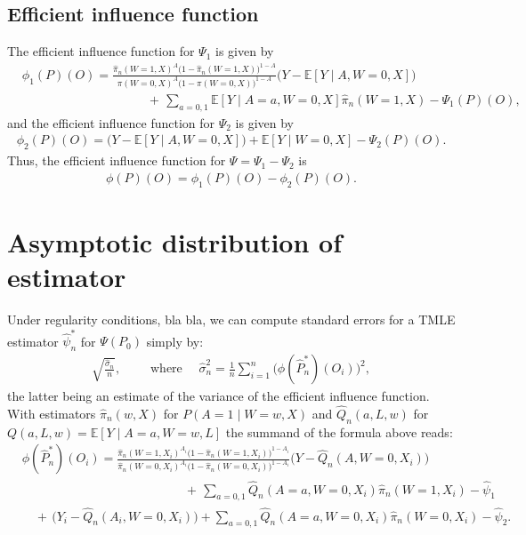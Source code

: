 \documentclass{article}
\newcommand{\EE}{\mathbb{E}}
\newcommand{\1}{\mathbb{1}}
\begin{document}
\subsection{Efficient influence function}

 The efficient influence function for \(\Psi_1\) is given
by
\begin{align*}
 & \phi_1 ( P ) (O) =  \frac{ \hat{\pi}_n ( W=1, X)^A \big( 1-
  \hat{\pi}_n ( W=1, X)\big)^{1-A}}{\pi ( W=0, X)^A \big( 1-
  \pi ( W=0, X)\big)^{1-A}} \big( Y - \EE[Y \mid A,W=0,X] \big)  \\
&\qquad\qquad\qquad\qquad\qquad  + \, 
  \sum_{a=0,1}\EE [Y \mid A=a, W=0, X]
  \hat{\pi}_n ( W=1, X) - \Psi_1(P)(O), 
\end{align*}
and the efficient influence function for \(\Psi_2\) is given by
\begin{align*}
  \phi_2 ( P )(O) = \big( Y - \EE[Y \mid A,W=0,X] \big)  +
  \EE [Y \mid  W=0, X]
  - \Psi_2(P)(O). 
\end{align*}
Thus, the efficient influence function for \(\Psi = \Psi_1 - \Psi_2\)
is
\begin{align*}
\phi (P) (O) = \phi_1(P)(O) - \phi_2(P)(O). 
\end{align*}

\section{Asymptotic distribution of estimator}

Under regularity conditions, bla bla, we can compute standard errors
for a TMLE estimator \(\hat{\psi}^*_n\) for \(\Psi(P_0)\) simply by:
\begin{align*}
  \sqrt{\frac{\hat{\sigma}_n}{n}},\qquad  \text{ where }  \quad \hat{\sigma}^2_n = \frac{1}{n} \sum_{i=1}^n
\big(  \phi (\hat{P}_n^*) (O_i)\big)^2 , 
\end{align*}
the latter being an estimate of the variance of the efficient
influence function. With estimators \(\hat{\pi}_n(w, X)\) for
\(P(A=1 \mid W=w, X)\) and \(\hat{Q}_n( a, L, w)\) for
\(Q ( a, L, w) = \EE [Y \mid A=a, W=w, L]\) the summand of the formula
above reads:
\begin{align*}
  & \phi (\hat{P}_n^*) (O_i)
    =   \frac{ \hat{\pi}_n ( W=1, X_i)^{A_i} \big( 1-
    \hat{\pi}_n ( W=1, X_i)\big)^{1-A_i}}{\hat{\pi}_n ( W=0, X_i)^{A_i} \big( 1-
    \hat{\pi}_n  ( W=0, X_i)\big)^{1-A_i}} \big( Y - \hat{Q}_n ( A, W=0, X_i)  \big)  \\
  &\qquad\qquad\qquad\qquad\qquad\quad\qquad  + \, 
    \sum_{a=0,1} \hat{Q}_n ( A=a, W=0, X_i)
    \hat{\pi}_n ( W=1, X_i) - \hat{\psi}_1  \\
  &\quad + \,   \big( Y_i -   \hat{Q}_n ( A_i, W=0, X_i) \big)  +
    \sum_{a=0,1} \hat{Q}_n ( A=a, W=0, X_i)
    \hat{\pi}_n ( W=0, X_i)
    -\hat{\psi}_2. 
\end{align*}


\newpage



\end{document}
